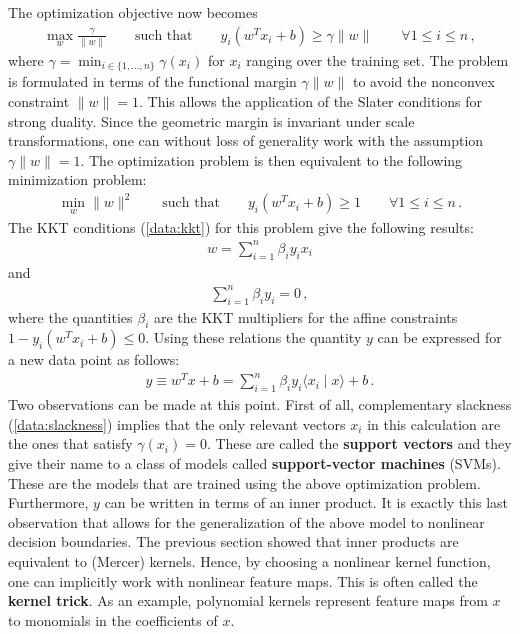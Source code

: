     The optimization objective now becomes
    \begin{gather}
        \max_w\frac{\gamma}{\|w\|} \qquad\text{such that}\qquad  y_i(w^Tx_i+b)\geq\gamma\|w\|\qquad\forall 1\leq i\leq n\,,
    \end{gather}
    where $\gamma=\min_{i\in\{1,\ldots,n\}}\gamma(x_i)$ for $x_i$ ranging over the training set. The problem is formulated in terms of the functional margin $\gamma\|w\|$ to avoid the nonconvex constraint $\|w\|=1$. This allows the application of the Slater conditions for strong duality. Since the geometric margin is invariant under scale transformations, one can without loss of generality work with the assumption $\gamma\|w\|=1$. The optimization problem is then equivalent to the following minimization problem:
    \begin{gather}
        \min_w\|w\|^2 \qquad\text{such that}\qquad y_i(w^Tx_i+b)\geq1\qquad\forall 1\leq i\leq n\,.
    \end{gather}
    The KKT conditions (\cref{data:kkt}) for this problem give the following results:
    \begin{gather}
        w = \sum_{i=1}^n\beta_iy_ix_i
    \end{gather}
    and
    \begin{gather}
        \sum_{i=1}^n\beta_iy_i = 0\,,
    \end{gather}
    where the quantities $\beta_i$ are the KKT multipliers for the affine constraints $1-y_i(w^Tx_i+b)\leq0$. Using these relations the quantity $y$ can be expressed for a new data point as follows:
    \begin{gather}
        y \equiv w^Tx + b = \sum_{i=1}^n\beta_iy_i\langle x_i\mid x \rangle + b\,.
    \end{gather}
    Two observations can be made at this point. First of all, complementary slackness (\cref{data:slackness}) implies that the only relevant vectors $x_i$ in this calculation are the ones that satisfy $\gamma(x_i)=0$. These are called the \textbf{support vectors} and they give their name to a class of models called \textbf{support-vector machines} (SVMs). These are the models that are trained using the above optimization problem. Furthermore, $y$ can be written in terms of an inner product. It is exactly this last observation that allows for the generalization of the above model to nonlinear decision boundaries. The previous section showed that inner products are equivalent to (Mercer) kernels. Hence, by choosing a nonlinear kernel function, one can implicitly work with nonlinear feature maps. This is often called the \textbf{kernel trick}. As an example, polynomial kernels represent feature maps from $x$ to monomials in the coefficients of $x$.

